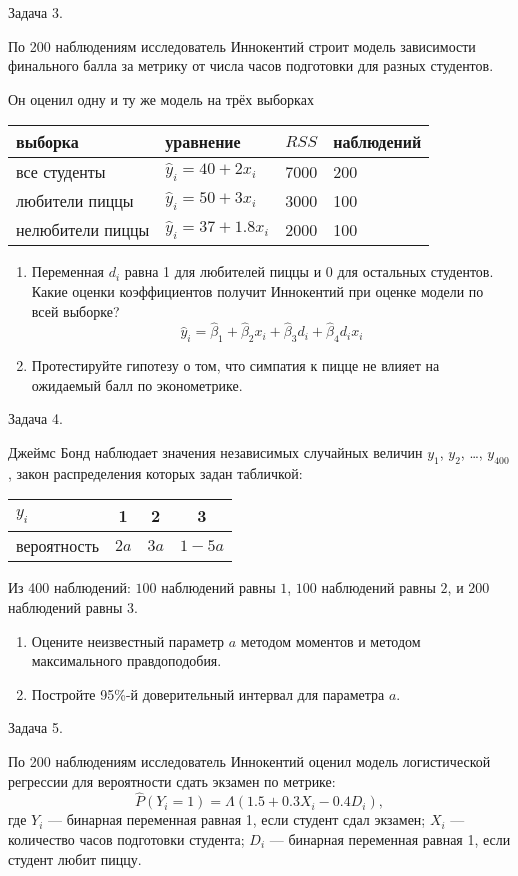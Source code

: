 \documentclass[11pt,russian,]{article}
\begin{document}
Задача 3.

По 200 наблюдениям исследователь Иннокентий строит модель зависимости
финального балла за метрику от числа часов подготовки для разных
студентов.

Он оценил одну и ту же модель на трёх выборках

\begin{longtable}[]{@{}llll@{}}
\toprule
выборка & уравнение & \(RSS\) & наблюдений\tabularnewline
\midrule
\endhead
все студенты & \(\hat y_i = 40 + 2x_i\) & 7000 & 200\tabularnewline
любители пиццы & \(\hat y_i = 50 + 3x_i\) & 3000 & 100\tabularnewline
нелюбители пиццы & \(\hat y_i = 37 + 1.8x_i\) & 2000 &
100\tabularnewline
\bottomrule
\end{longtable}

\begin{enumerate}
    \item Переменная $d_i$ равна 1 для любителей пиццы и 0 для остальных студентов.
Какие оценки коэффициентов получит Иннокентий при оценке модели по всей выборке?
    \[
    \hat y_i = \hat \beta_1 + \hat \beta_2 x_i + \hat \beta_3 d_i + \hat\beta_4 d_i x_i
    \]
    \item Протестируйте гипотезу о том, что симпатия к пицце не влияет на ожидаемый балл по эконометрике.
\end{enumerate}

Задача 4.

Джеймс Бонд наблюдает значения независимых случайных величин \(y_1\),
\(y_2\), \ldots, \(y_{400}\), закон распределения которых задан
табличкой:

\begin{longtable}[]{@{}lccc@{}}
\toprule
\(y_i\) & 1 & 2 & 3\tabularnewline
\midrule
\endhead
вероятность & \(2a\) & \(3a\) & \(1-5a\)\tabularnewline
\bottomrule
\end{longtable}

Из 400 наблюдений: \(100\) наблюдений равны \(1\), \(100\) наблюдений
равны \(2\), и \(200\) наблюдений равны \(3\).

\begin{enumerate}
 \item Оцените неизвестный параметр $a$ методом моментов и методом максимального правдоподобия.
 \item Постройте 95\%-й доверительный интервал для параметра $a$.
\end{enumerate}

Задача 5.

По 200 наблюдениям исследователь Иннокентий оценил модель логистической
регрессии для вероятности сдать экзамен по метрике: \[
\hat P(Y_i = 1) = \Lambda(1.5 + 0.3X_i - 0.4 D_i),
\] где \(Y_i\) --- бинарная переменная равная 1, если студент сдал
экзамен; \(X_i\) --- количество часов подготовки студента; \(D_i\) ---
бинарная переменная равная 1, если студент любит пиццу.
\end{document}
